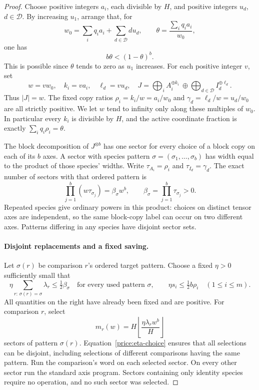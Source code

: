 \begin{proof}
Choose positive integers \(a_i\), each divisible by \(H\), and positive
integers \(u_d\), \(d\in\mathcal D\).  By increasing \(u_1\), arrange
that, for
\[
 w_0=\sum_iq_i a_i+\sum_{d\in\mathcal D}d u_d,
 \qquad
 \theta=\frac{\sum_iq_i a_i}{w_0},
\]
one has
\begin{equation}
 b\theta<(1-\theta)^b.
 \label{price:identity-capacity}
\end{equation}
This is possible since \(\theta\) tends to zero as \(u_1\) increases.
For each positive integer \(v\), set
\[
 w=vw_0,\quad k_i=va_i,\quad \ell_d=vu_d,\quad
 J=\bigoplus_i A_i^{\oplus k_i}
       \ \oplus\!\bigoplus_{d\in\mathcal D}I_d^{\oplus\ell_d}.
\]
Thus \(|J|=w\).  The fixed copy ratios
\(\rho_i=k_i/w=a_i/w_0\) and \(\gamma_d=\ell_d/w=u_d/w_0\)
are all strictly positive.  We let \(w\) tend to infinity only along
these multiples of \(w_0\).  In particular every \(k_i\) is divisible
by \(H\), and the active coordinate fraction is exactly
\(\sum_iq_i\rho_i=\theta\).

The block decomposition of \(J^{\otimes b}\) has one sector for every
choice of a block copy on each of its \(b\) axes.  A sector with species
pattern \(\sigma=(\sigma_1,\ldots,\sigma_b)\) has width equal to the
product of those species' widths.  Write \(\tau_{A_i}=\rho_i\) and
\(\tau_{I_d}=\gamma_d\).  The exact number of sectors with that ordered
pattern is
\begin{equation}
 \prod_{j=1}^b (w\tau_{\sigma_j})
     =\beta_\sigma w^b,
 \qquad \beta_\sigma=\prod_{j=1}^b\tau_{\sigma_j}>0.
 \label{price:sector-count}
\end{equation}
Repeated species give ordinary powers in this product: choices on distinct
tensor axes are independent, so the same block-copy label can occur on
two different axes.  Patterns differing in any species have disjoint
sector sets.

\paragraph{Disjoint replacements and a fixed saving.}
Let \(\sigma(r)\) be comparison \(r\)'s ordered target pattern.
Choose a fixed \(\eta>0\) sufficiently small that
\begin{equation}
 \eta\sum_{r:\,\sigma(r)=\sigma}\lambda_r
       \leq \tfrac12\beta_\sigma
 \quad\text{for every used pattern }\sigma,
 \qquad
 \eta s_i\leq\tfrac12 b\rho_i\quad(1\leq i\leq m).
 \label{price:eta-choice}
\end{equation}
All quantities on the right have already been fixed and are positive.
For comparison \(r\), select
\[
 m_r(w)=H\left\lfloor\frac{\eta\lambda_r w^b}{H}\right\rfloor
\]
sectors of pattern \(\sigma(r)\).  Equation~\eqref{price:eta-choice}
ensures that all selections can be disjoint, including selections of
different comparisons having the same pattern.  Run the comparison's
word on each selected sector.  On every other sector run the standard
axis program.  Sectors containing only identity species require no
operation, and no such sector was selected.


\end{proof}
